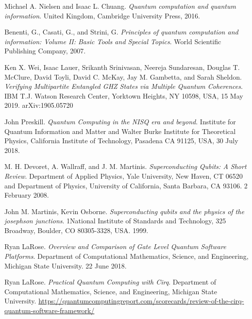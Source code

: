 \documentclass[11pt, a4paper, twoside, openright]{book}
\renewcommand{\'}[0]{\`}
\theoremstyle{definition}
\begin{document}
\cleardoublepage
{}
\begin{thebibliography}{99}

Michael A. Nielsen and Isaac L. Chuang.
\textit{Quantum computation and quantum information}. 
United Kingdom, Cambridge University Press, 2016.

Benenti, G., Casati, G., and Strini, G. 
\textit{Principles of quantum computation and
information: Volume II: Basic Tools and Special Topics}. 
World Scientific Publishing
Company, 2007.


Ken X. Wei, Isaac Lauer, Srikanth Srinivasan, Neereja Sundaresan, Douglas T. McClure, David Toyli, David C. McKay, Jay M. Gambetta, and Sarah Sheldon.
\textit{Verifying Multipartite Entangled GHZ States via Multiple Quantum Coherences}.
IBM T.J. Watson Research Center, Yorktown Heights, NY 10598, USA, 15 May 2019.
arXiv:1905.05720

John Preskill.
\textit{Quantum Computing in the NISQ era and beyond}.
Institute for Quantum Information and Matter and Walter Burke Institute for Theoretical Physics, California Institute of Technology, Pasadena CA 91125, USA, 30 July 2018.

M. H. Devoret, A. Wallraff, and J. M. Martinis.
\textit{Superconducting Qubits: A Short Review}.
Department of Applied Physics, Yale University, New Haven, CT 06520 and Department of Physics, University of California, Santa Barbara, CA 93106.
2 February 2008.

John M. Martinis, Kevin Osborne.
\textit{Superconducting qubits and the physics of the josephson junctions}.
1National Institute of Standards and Technology, 325 Broadway, Boulder, CO 80305-3328, USA. 
1999.

Ryan LaRose.
\textit{Overview and Comparison of Gate Level Quantum Software Platforms}.
Department of Computational Mathematics, Science, and Engineering, Michigan State University. 
22 June 2018.

Ryan LaRose.
\textit{Practical Quantum Computing with Cirq}.
Department of Computational Mathematics, Science, and Engineering, Michigan State University. 
\url{https://quantumcomputingreport.com/scorecards/review-of-the-cirq-quantum-software-framework/}


\end{thebibliography}
\end{document}
